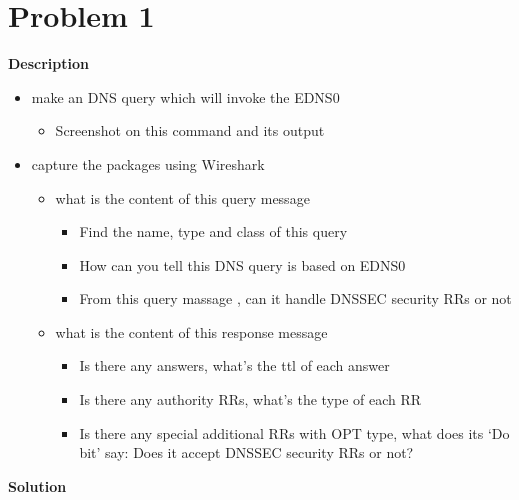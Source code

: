 \documentclass[12pt,letterpaper]{ctexart}
\begin{document}
\section*{Problem 1}

{\bf Description}

\begin{itemize}
  \item make an DNS query which will invoke the EDNS0
  \begin{itemize}
    \item Screenshot on this command and its output
  \end{itemize}
  \item capture the packages using Wireshark
  \begin{itemize}
    \item what is the content of this query message
    \begin{itemize}
      \item Find the name, type and class of this query
      \item How can you tell this DNS query is based on EDNS0
      \item From this query massage , can it handle DNSSEC security RRs or not
    \end{itemize}
    \item what is the content of this response message
    \begin{itemize}
      \item Is there any answers, what’s the ttl of each answer
      \item Is there any authority RRs, what’s the type of each RR
      \item Is there any special additional RRs with OPT type, what does its ‘Do bit’ say: Does it accept DNSSEC security RRs or not?
    \end{itemize}
  \end{itemize}
\end{itemize}


{\bf Solution}
\end{document}
